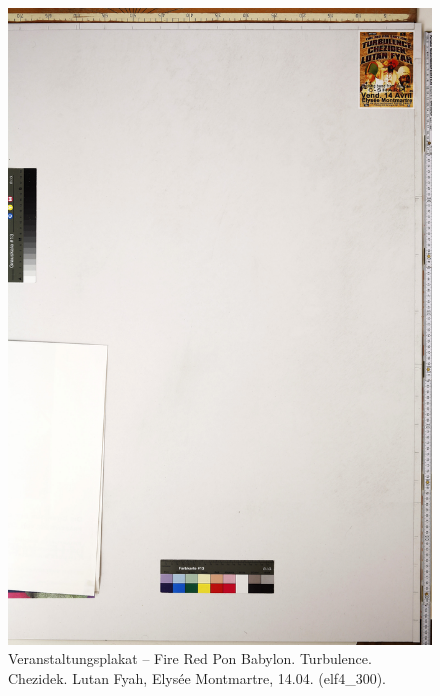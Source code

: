 \documentclass[a4paper,12pt,ngerman]{article}
\begin{document}
\newpage
\begin{figure}[ht]
\includegraphics[width=\linewidth]{Abbildung_53_(elf4_300)}
\centering
\caption{Veranstaltungsplakat -- Fire Red Pon Babylon. Turbulence. Chezidek. Lutan Fyah, Elysée Montmartre, 14.04. (elf4\_300).}
\end{figure}
\end{document}
